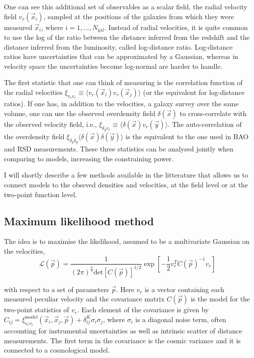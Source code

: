 One can see this additional set of observables as a scalar field, the radial 
velocity field  $v_r(\vec{x}_i)$, sampled 
at the positions of the galaxies from which they were measured $\vec{x}_i$, 
where $i=1,\ldots,N_\text{gal}$. 
Instead of radial velocities, it is quite common to use the log of the ratio between the distance inferred from 
the redshift and the distance inferred from the luminosity, called log-distance ratio. 
Log-distance ratios have uncertainties that can be approximated by a Gaussian, 
whereas in velocity space the uncertainties become log-normal are harder to handle. 

The first statistic that one can think of measuring is the correlation function of the 
radial velocities  $\xi_{v_r v_r} \equiv \langle v_r(\vec{x}_i) v_r(\vec{x}_j) \rangle$ 
(or the equivalent for log-distance ratios). 
If one has, in addition to the velocities, a galaxy survey over the same volume, one
can use the observed overdensity field $\delta(\vec{x})$ to cross-correlate with the 
observed velocity field, i.e., $\xi_{\delta_g v_r} \equiv \langle \delta(\vec{x}) v_r(\vec{y})\rangle$. 
The auto-correlation of the overdensity field $\xi_{\delta_g \delta_g} \langle \delta(\vec{x})\delta(\vec{y})\rangle$ 
is the equivalent to the one used in BAO and RSD measurements. 
These three statistics can be analysed jointly when comparing to models, 
increasing the constraining power. 

I will shortly describe a few methods available in the litterature that 
allows us to connect models to the obseved densities and velocities, 
at the field level or at the two-point function level. 

    \subsection{Maximum likelihood method}
    \label{velocities:methods:maximum_likelihood}

    The idea is to maximise the likelihood, assumed to be a multivariate Gaussian on 
    the velocities,
    \begin{equation}
        \mathcal{L}(\vec{p}) = \frac{1}{(2 \pi)^{\frac{n}{2}} \text{det}[C(\vec{p})]^{1/2} }
            \exp\left[-\frac{1}{2} v_r^T C(\vec{p})^{-1} v_r\right]
        \label{eq:likelihood}
    \end{equation}

    with respect to a set of parameters $\vec{p}$. Here $v_r$ is a vector containing each 
    measured peculiar velocity and the covariance matrix $C(\vec{p})$ is the model 
    for the two-point statistics of $v_r$. Each element of the covariance is given by 
    $C_{ij} =  \xi^\text{model}_{v_r v_r}(\vec{x}_i, \vec{x}_j, \vec{p}) + \delta^K_{ij} \sigma_i \sigma_j$, 
    where $\sigma_i$ is a diagonal noise term, often accounting for instrumental uncertainties 
    as well as intrinsic scatter of distance measurements. 
    The first term in the covariance 
    is the cosmic variance and it is connected to a cosmological model. 

